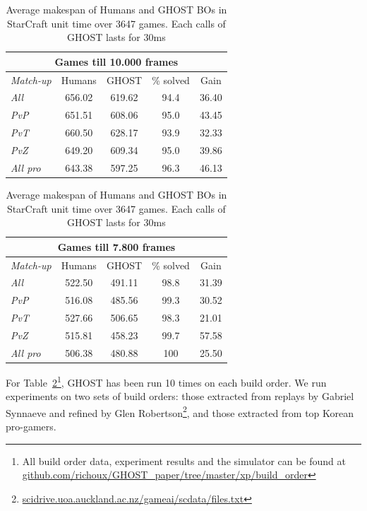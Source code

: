 \documentclass[journal]{IEEEtran}
\newcommand{\ghost}{\textsc{GHOST}\xspace}
\begin{document}
\begin{table}[ht]
  \caption{Average  makespan  of Humans  and  \ghost  BOs  in
    StarCraft unit time over 3647 games. Each calls  of \ghost
    lasts for 30ms}
  \label{tab:bo}
  \centering
  \begin{tabular}{|l|c|c|c|c|}
    \hline
    \multicolumn{5}{|c|}{Games till 10.000 frames} \\
    \hline
    {\em Match-up} & Humans & \ghost & \% solved &
    Gain \\
    \hline
    {\em All} & 656.02 & 619.62 & 94.4 & 36.40\\
    {\em PvP} & 651.51 & 608.06 & 95.0 & 43.45\\
    {\em PvT} & 660.50 & 628.17 & 93.9 & 32.33\\
    {\em PvZ} & 649.20 & 609.34 & 95.0 & 39.86\\
    \hline
    \hline
    {\em All pro} & 643.38 & 597.25 & 96.3 & 46.13\\
    \hline
  \end{tabular}
  \begin{tabular}{|l|c|c|c|c|}
    \hline
    \multicolumn{5}{|c|}{Games till 7.800 frames} \\
    \hline
    {\em Match-up} & Humans & \ghost & \% solved &
    Gain \\
    \hline
    {\em All} & 522.50 & 491.11 & 98.8 & 31.39\\
    {\em PvP} & 516.08 & 485.56 & 99.3 & 30.52\\
    {\em PvT} & 527.66 & 506.65 & 98.3 & 21.01\\
    {\em PvZ} & 515.81 & 458.23 & 99.7 & 57.58\\
    \hline
    \hline
    {\em All pro} & 506.38 & 480.88 & 100 & 25.50\\
    \hline
  \end{tabular}
\end{table}

For  Table~\ref{tab:bo}\footnote{All  build   order  data,  experiment
  results     and     the     simulator    can     be     found     at
  \href{https://github.com/richoux/GHOST\_paper/tree/master/xp/build\_order}{github.com/richoux/GHOST\_paper/tree/master/xp/build\_order}},
\ghost has been  run 10 times on each build  order. We run experiments
on two sets  of build orders: those extracted from  replays by Gabriel
Synnaeve\cite{SynnaeveDataset} and                  refined                  by                  Glen
Robertson\footnote{\href{http://scidrive.uoa.auckland.ac.nz/gameai/scdata/files.txt}{scidrive.uoa.auckland.ac.nz/gameai/scdata/files.txt}},
and those extracted from top Korean pro-gamers.
\end{document}
